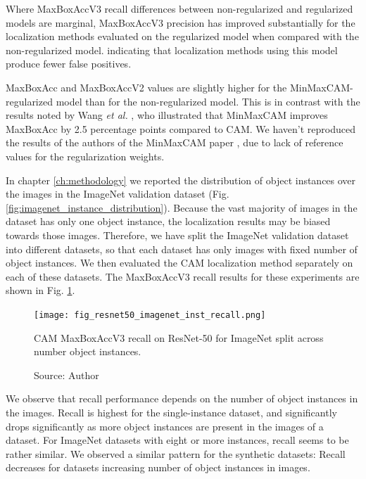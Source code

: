 Where MaxBoxAccV3 recall differences between non-regularized and regularized models are marginal, MaxBoxAccV3 precision has improved substantially for the localization methods evaluated on the regularized model when compared with the non-regularized model. indicating that localization methods using this model produce fewer false positives.

MaxBoxAcc and MaxBoxAccV2 values are slightly higher for the MinMaxCAM-regularized model than for the non-regularized model. This is in contrast with the results noted by Wang \textit{et al.} \cite{wang2021minmaxcam}, who illustrated that MinMaxCAM improves MaxBoxAcc by 2.5 percentage points compared to CAM. We haven't reproduced the results of the authors of the MinMaxCAM paper \cite{wang2021minmaxcam}, due to lack of reference values for the regularization weights.

In chapter \ref{ch:methodology} we reported the distribution of object instances over the images in the ImageNet validation dataset (Fig. \ref{fig:imagenet_instance_distribution}). Because the vast majority of images in the dataset has only one object instance, the localization results may be biased towards those images. Therefore, we have split the ImageNet validation dataset into different datasets, so that each dataset has only images with fixed number of object instances. We then evaluated the CAM localization method separately on each of these datasets. The MaxBoxAccV3 recall results for these experiments are shown in Fig. \ref{fig:resnet50_imagenet_inst_recall}. 

\begin{figure}[h]
    \begin{center}       
    \texttt{[image: fig\_resnet50\_imagenet\_inst\_recall.png]}
    \caption[CAM MaxBoxAccV3 recall on ResNet-50 for ImageNet split across number object instances]{CAM MaxBoxAccV3 recall on ResNet-50 for ImageNet split across number object instances.}
    \caption*{Source: Author}
    \label{fig:resnet50_imagenet_inst_recall}
    \end{center}
\end{figure}

We observe that recall performance depends on the number of object instances in the images. Recall is highest for the single-instance dataset, and significantly drops significantly as more object instances are present in the images of a dataset. For ImageNet datasets with eight or more instances, recall seems to be rather similar. We observed a similar pattern for the synthetic datasets: Recall decreases for datasets increasing number of object instances in images.

